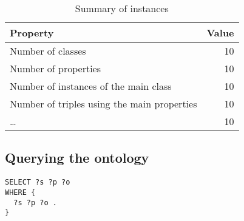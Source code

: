 \begin{table}[H]
\centering
\caption{Summary of instances}
\label{tab:summary}
\begin{tabular}{lr}
  \toprule
  Property & Value \\
  \midrule
  Number of classes & 10\\
  Number of properties & 10\\
  Number of instances of the main class & 10\\
  Number of triples using the main properties & 10\\
  \dots & 10\\
  \bottomrule
\end{tabular}
\end{table}

\subsection{Querying the ontology}%
\label{sub:querying}


\begin{verbatim}
SELECT ?s ?p ?o
WHERE {
  ?s ?p ?o .
}
\end{verbatim}

